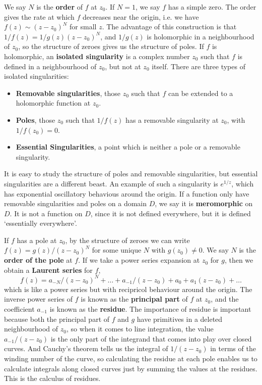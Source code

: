 We say $N$ is the {\bf order} of $f$ at $z_0$. If $N = 1$, we say $f$ has a simple zero. The order gives the rate at which $f$ decreases near the origin, i.e. we have $f(z) \sim (z-z_0)^N$ for small $z$. The advantage of this construction is that $1/f(z) = 1/g(z)(z - z_0)^N$, and $1/g(z)$ is holomorphic in a neighbourhood of $z_0$, so the structure of zeroes gives us the structure of poles. If $f$ is holomorphic, an {\bf isolated singularity} is a complex number $z_0$ such that $f$ is defined in a neighbourhood of $z_0$, but not at $z_0$ itself. There are three types of isolated singularities:
%
\begin{itemize}
    \item {\bf Removable singularities}, those $z_0$ such that $f$ can be extended to a holomorphic function at $z_0$.

    \item {\bf Poles}, those $z_0$ such that $1/f(z)$ has a removable singularity at $z_0$, with $1/f(z_0) = 0$.

    \item {\bf Essential Singularities}, a point which is neither a pole or a removable singularity.
\end{itemize}
%
It is easy to study the structure of poles and removable singularities, but essential singularities are a different beast. An example of such a singularity is $e^{1/z}$, which has exponential oscillatory behavious around the origin. If a function only have removable singularities and poles on a domain $D$, we say it is {\bf meromorphic} on $D$. It is not a function on $D$, since it is not defined everywhere, but it is defined `essentially everywhere'.

If $f$ has a pole at $z_0$, by the structure of zeroes we can write $f(z) = g(z)/(z - z_0)^N$ for some unique $N$ with $g(z_0) \neq 0$. We say $N$ is the {\bf order of the pole} at $f$. If we take a power series expansion at $z_0$ for $g$, then we obtain a {\bf Laurent series} for $f$,
%
\[ f(z) = a_{-N}/(z - z_0)^N + \dots + a_{-1}/(z - z_0) + a_0 + a_1(z - z_0) + \dots \]
%
which is like a power series but with recipricol behaviour around the origin. The inverse power series of $f$ is known as the {\bf principal part} of $f$ at $z_0$, and the coefficient $a_{-1}$ is known as the {\bf residue}. The importance of residue is important because both the principal part of $f$ and $g$ have primitives in a deleted neighbourhood of $z_0$, so when it comes to line integration, the value $a_{-1}/(z - z_0)$ is the only part of the integrand that comes into play over closed curves. And Cauchy's theorem tells us the integral of $1/(z - z_0)$ in terms of the winding number of the curve, so calculating the residue at each pole enables us to calculate integrals along closed curves just by summing the values at the residues. This is the calculus of residues.

